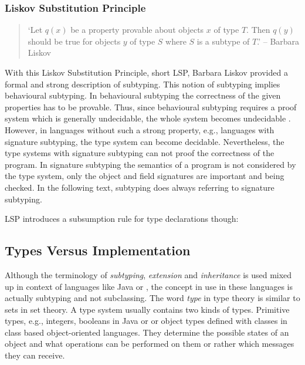 \subsubsection{Liskov Substitution Principle}
\begin{quotation}
`Let $q(x)$ be a property provable about objects $x$ of type $T$. Then
$q(y)$ should be true for objects $y$ of type $S$ where $S$ is a subtype
of $T$.' -- Barbara Liskov \cite{liskov_behavioral_2001}
\end{quotation}

With this Liskov Substitution Principle, short LSP, Barbara Liskov
provided a formal and strong description of subtyping. This
notion of subtyping implies behavioural subtyping. In behavioural
subtyping the correctness of the given properties has to be
provable. Thus, since behavioural subtyping requires a proof system
which is generally undecidable, the whole system becomes undecidable
\cite{poll_behavioural_1998}. However, in languages without such a strong
property, e.g., languages with signature subtyping, the type system can
become decidable. Nevertheless, the type systems with signature subtyping
can not proof the correctness of the program. In signature subtyping
the semantics of a program is not considered by the type system, only
the object and field signatures are important and being checked. In the
following text, subtyping does always referring to signature subtyping.

LSP introduces a subsumption rule for type declarations though:

\begin{defn}[Subsumption]
\label{def:subsumption}
	\begin{mathpar}
	\end{mathpar}
\end{defn}

\subsection{Types Versus Implementation}
\label{sec:sharingTypes}
Although the terminology of \emph{subtyping}, \emph{extension} and
\emph{inheritance} is used mixed up in context of languages like Java
or \cpp, the concept in use in these languages is actually subtyping and not subclassing.
The word \emph{type} in type theory is similar to sets in set theory. A
type system usually contains two kinds of types. Primitive types,
e.g., integers, booleans in Java or \cpp or object types defined with
classes in class based object-oriented languages. They determine the
possible states of an object and what operations can be performed on them
or rather which messages they can receive.

